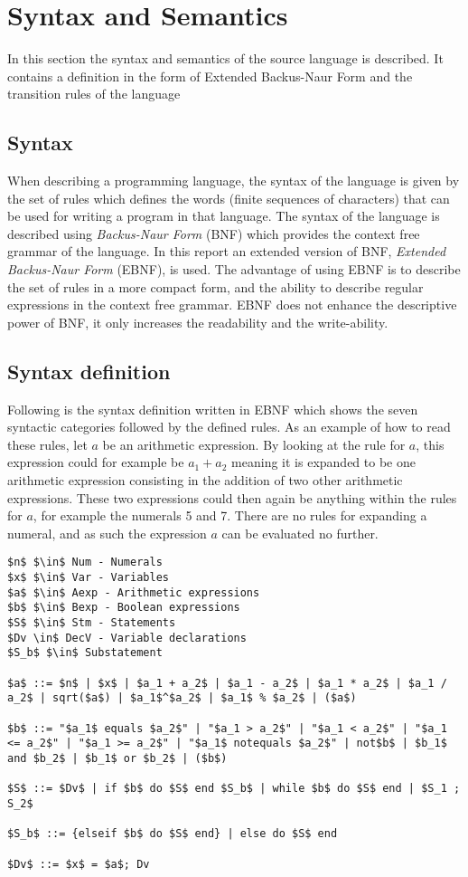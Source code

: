 \chapter{Syntax and Semantics}\label{analysis:syntax-and-semantics}
In this section the syntax and semantics of the source language is described. It contains a definition in the form of Extended Backus-Naur Form and the transition rules of the language

\section{Syntax}
When describing a programming language, the syntax of the language is given by the set of rules which defines the words (finite sequences of characters) that can be used for writing a program in that language. The syntax of the language is described using \textit{Backus-Naur Form} (BNF) which provides the context free grammar of the language.
In this report an extended version of BNF, \textit{Extended Backus-Naur Form} (EBNF), is used. The advantage of using EBNF is to describe the set of rules in a more compact form, and the ability to describe regular expressions in the context free grammar. EBNF does not enhance the descriptive power of BNF, it only increases the readability and the write-ability.

\section{Syntax definition}\label{sec:anlysis:syntax-definition}
Following is the syntax definition written in EBNF which shows the seven syntactic categories followed by the defined rules. As an example of how to read these rules, let $a$ be an arithmetic expression. By looking at the rule for $a$, this expression could for example be $a_1 + a_2$ meaning it is expanded to be one arithmetic expression consisting in the addition of two other arithmetic expressions. These two expressions could then again be anything within the rules for $a$, for example the numerals 5 and 7. There are no rules for expanding a numeral, and as such the expression $a$ can be evaluated no further.
\begin{lstlisting}[mathescape, captionpos=b, caption=Syntax formation rules, label=lst:syntax-formation]
$n$ $\in$ Num - Numerals
$x$ $\in$ Var - Variables
$a$ $\in$ Aexp - Arithmetic expressions
$b$ $\in$ Bexp - Boolean expressions
$S$ $\in$ Stm - Statements
$Dv \in$ DecV - Variable declarations
$S_b$ $\in$ Substatement

$a$ ::= $n$ | $x$ | $a_1 + a_2$ | $a_1 - a_2$ | $a_1 * a_2$ | $a_1 / a_2$ | sqrt($a$) | $a_1$^$a_2$ | $a_1$ % $a_2$ | ($a$)

$b$ ::= "$a_1$ equals $a_2$" | "$a_1 > a_2$" | "$a_1 < a_2$" | "$a_1 <= a_2$" | "$a_1 >= a_2$" | "$a_1$ notequals $a_2$" | not$b$ | $b_1$ and $b_2$ | $b_1$ or $b_2$ | ($b$)

$S$ ::= $Dv$ | if $b$ do $S$ end $S_b$ | while $b$ do $S$ end | $S_1 ; S_2$

$S_b$ ::= {elseif $b$ do $S$ end} | else do $S$ end

$Dv$ ::= $x$ = $a$; Dv
\end{lstlisting}

